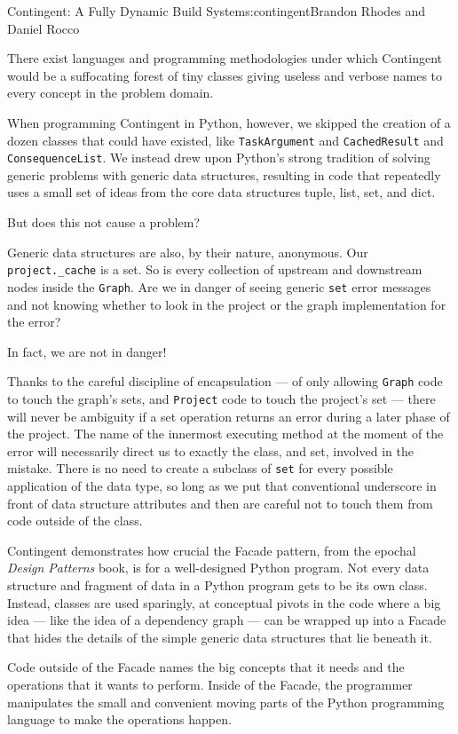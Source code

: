 \begin{aosachapter}{Contingent: A Fully Dynamic Build System}{s:contingent}{Brandon Rhodes and Daniel Rocco}
\label{conclusion}

There exist languages and programming methodologies under which
Contingent would be a suffocating forest of tiny classes giving useless
and verbose names to every concept in the problem domain.

When programming Contingent in Python, however, we skipped the creation
of a dozen classes that could have existed, like \texttt{TaskArgument}
and \texttt{CachedResult} and \texttt{ConsequenceList}. We instead drew
upon Python's strong tradition of solving generic problems with generic
data structures, resulting in code that repeatedly uses a small set of
ideas from the core data structures tuple, list, set, and dict.

But does this not cause a problem?

Generic data structures are also, by their nature, anonymous. Our
\texttt{project.\_cache} is a set. So is every collection of upstream
and downstream nodes inside the \texttt{Graph}. Are we in danger of
seeing generic \texttt{set} error messages and not knowing whether to
look in the project or the graph implementation for the error?

In fact, we are not in danger!

Thanks to the careful discipline of encapsulation --- of only allowing
\texttt{Graph} code to touch the graph's sets, and \texttt{Project} code
to touch the project's set --- there will never be ambiguity if a set
operation returns an error during a later phase of the project. The name
of the innermost executing method at the moment of the error will
necessarily direct us to exactly the class, and set, involved in the
mistake. There is no need to create a subclass of \texttt{set} for every
possible application of the data type, so long as we put that
conventional underscore in front of data structure attributes and then
are careful not to touch them from code outside of the class.

Contingent demonstrates how crucial the Facade pattern, from the epochal
\emph{Design Patterns} book, is for a well-designed Python program. Not
every data structure and fragment of data in a Python program gets to be
its own class. Instead, classes are used sparingly, at conceptual pivots
in the code where a big idea --- like the idea of a dependency graph ---
can be wrapped up into a Facade that hides the details of the simple
generic data structures that lie beneath it.

Code outside of the Facade names the big concepts that it needs and the
operations that it wants to perform. Inside of the Facade, the
programmer manipulates the small and convenient moving parts of the
Python programming language to make the operations happen.

\end{aosachapter}
